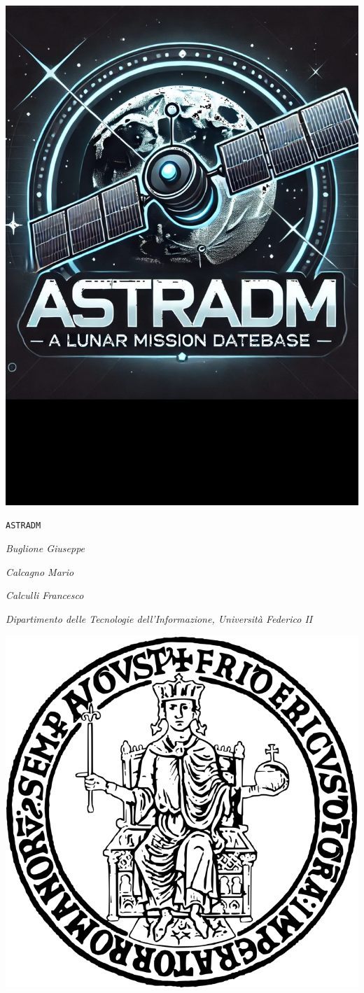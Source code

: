 \documentclass[10pt]{report}
\begin{document}
\begin{titlepage}
  \centering
  \includegraphics[width=0.75\linewidth]{images/ADM.jpeg}\par
  {\Large \textsc{\texttt{ASTRADM}}\par}
  {\Large\itshape Buglione Giuseppe\par}
  {\Large\itshape Calcagno Mario\par}
  {\Large\itshape Calculli Francesco\par}
  {\Large\itshape Dipartimento delle Tecnologie dell'Informazione, Università Federico II\par}
  \vfill
  \includegraphics[width=0.15\linewidth]{images/F2.png}
\end{titlepage}

\tableofcontents






\end{document}
